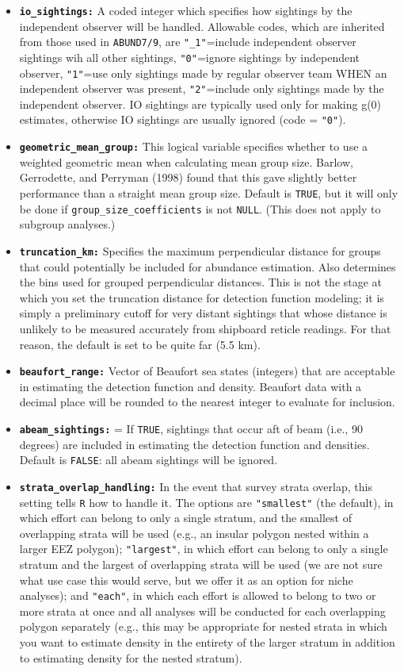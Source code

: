 \documentclass[
]{book}
\begin{document}
\begin{itemize}
\item
  \textbf{\texttt{io\_sightings:}} A coded integer which specifies how sightings by the independent observer will be handled. Allowable codes, which are inherited from those used in \texttt{ABUND7/9}, are \texttt{"\_1"}=include independent observer sightings wih all other sightings, \texttt{"0"}=ignore sightings by independent observer, \texttt{"1"}=use only sightings made by regular observer team WHEN an independent observer was present, \texttt{"2"}=include only sightings made by the independent observer. IO sightings are typically used only for making g(0) estimates, otherwise IO sightings are usually ignored (code = \texttt{"0"}).
\item
  \textbf{\texttt{geometric\_mean\_group:}} This logical variable specifies whether to use a weighted geometric mean when calculating mean group size. Barlow, Gerrodette, and Perryman (1998) found that this gave slightly better performance than a straight mean group size. Default is \texttt{TRUE}, but it will only be done if \texttt{group\_size\_coefficients} is not \texttt{NULL}. (This does not apply to subgroup analyses.)
\item
  \textbf{\texttt{truncation\_km:}} Specifies the maximum perpendicular distance for groups that could potentially be included for abundance estimation. Also determines the bins used for grouped perpendicular distances. This is not the stage at which you set the truncation distance for detection function modeling; it is simply a preliminary cutoff for very distant sightings that whose distance is unlikely to be measured accurately from shipboard reticle readings. For that reason, the default is set to be quite far (5.5 km).
\item
  \textbf{\texttt{beaufort\_range:}} Vector of Beaufort sea states (integers) that are acceptable in estimating the detection function and density. Beaufort data with a decimal place will be rounded to the nearest integer to evaluate for inclusion.
\item
  \textbf{\texttt{abeam\_sightings:}} = If \texttt{TRUE}, sightings that occur aft of beam (i.e., 90 degrees) are included in estimating the detection function and densities. Default is \texttt{FALSE}: all abeam sightings will be ignored.
\item
  \textbf{\texttt{strata\_overlap\_handling:}} In the event that survey strata overlap, this setting tells \texttt{R} how to handle it. The options are \texttt{"smallest"} (the default), in which effort can belong to only a single stratum, and the smallest of overlapping strata will be used (e.g., an insular polygon nested within a larger EEZ polygon); \texttt{"largest"}, in which effort can belong to only a single stratum and the largest of overlapping strata will be used (we are not sure what use case this would serve, but we offer it as an option for niche analyses); and \texttt{"each"}, in which each effort is allowed to belong to two or more strata at once and all analyses will be conducted for each overlapping polygon separately (e.g., this may be appropriate for nested strata in which you want to estimate density in the entirety of the larger stratum in addition to estimating density for the nested stratum).

\end{itemize}
\end{document}

